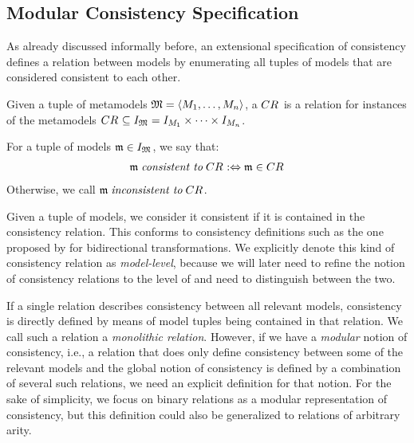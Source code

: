 \subsection{Modular Consistency Specification}

As already discussed informally before, an extensional specification of consistency defines a relation between models by enumerating all tuples of models that are considered consistent to each other.

\begin{definition}[\ModelLevelConsistencyRelation]
    \label{def:modellevelconsistencyrelation}
    Given a tuple of metamodels $\metamodeltuple{M} = \tupled{\metamodelsequence{M}{n}}$, a \emph{\modellevelconsistencyrelation} $\consistencyrelation{CR}{}$ is a relation for instances of the metamodels $\consistencyrelation{CR}{} \subseteq \metamodeltupleinstanceset{M} = \metamodelinstanceset{M}{1} \times \dots \times \metamodelinstanceset{M}{n}$.

    For a tuple of models $\modeltuple{m} \in \metamodeltupleinstanceset{M}$, we say that:
    \begin{align*}
        \modeltuple{m} \consistenttomath \consistencyrelation{CR}{} \equivalentperdefinition \modeltuple{m} \in \consistencyrelation{CR}{}
    \end{align*}
    Otherwise, we call $\modeltuple{m} \inconsistenttomath \consistencyrelation{CR}{}$.
\end{definition}

Given a tuple of models, we consider it consistent if it is contained in the consistency relation.
This conforms to consistency definitions such as the one proposed by \textcite{stevens2010sosym} for bidirectional transformations.
We explicitly denote this kind of consistency relation as \emph{model-level}, because we will later need to refine the notion of consistency relations to the level of \metaclasses and need to distinguish between the two.

If a single relation describes consistency between all relevant models, consistency is directly defined by means of model tuples being contained in that relation. We call such a relation a \emph{monolithic relation}.
However, if we have a \emph{modular} notion of consistency, i.e., a relation that does only define consistency between some of the relevant models and the global notion of consistency is defined by a combination of several such relations, we need an explicit definition for that notion.
For the sake of simplicity, we focus on binary relations as a modular representation of consistency, but this definition could also be generalized to relations of arbitrary arity.

